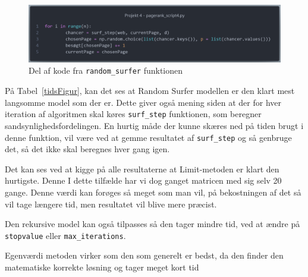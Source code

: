 \begin{figure}
    \centering
    \includegraphics[width = \linewidth]{Billeder/Kode1.png}
    \caption{Del af kode fra \texttt{random\_surfer} funktionen}
\end{figure}


På Tabel~\ref{tidsFigur}, kan det ses at Random Surfer modellen er den klart mest langsomme model som der er. Dette giver også mening siden at der for hver iteration af algoritmen skal køres \texttt{surf\_step} funktionen, som beregner sandsynlighedsfordelingen. En hurtig måde der kunne skæres ned på tiden brugt i denne funktion, vil være ved at gemme resultatet af \texttt{surf\_step} og så genbruge det, så det ikke skal beregnes hver gang igen.

Det kan ses ved at kigge på alle resultaterne at Limit-metoden er klart den hurtigste. Denne I dette tilfælde har vi dog ganget matricen med sig selv 20 gange. Denne værdi kan forøges så meget som man vil, på bekostningen af det så vil tage længere tid, men resultatet vil blive mere præcist.

Den rekursive model kan også tilpasses så den tager mindre tid, ved at ændre på \texttt{stopvalue} eller \texttt{max\_iterations}.

Egenværdi metoden virker som den som generelt er bedst, da den finder den matematiske korrekte løsning og tager meget kort tid


